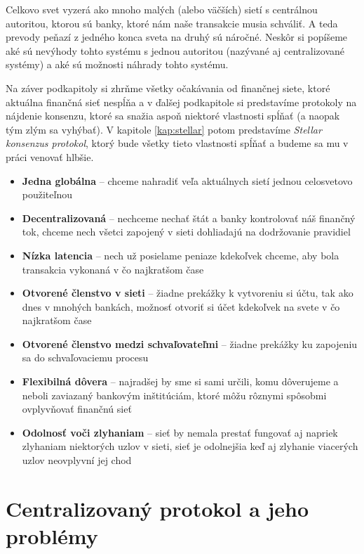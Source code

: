 Celkovo svet vyzerá ako mnoho malých (alebo väčších) sietí s centrálnou autoritou,
ktorou sú banky, ktoré nám naše transakcie musia schváliť.
A teda prevody peňazí z jedného konca sveta na druhý sú náročné.
Neskôr si popíšeme aké sú nevýhody tohto systému s jednou autoritou (nazývané aj
centralizované systémy) a aké sú možnosti náhrady tohto systému.

Na záver podkapitoly si zhrňme všetky očakávania od finančnej siete, ktoré
aktuálna finančná sieť nespĺňa a v ďalšej podkapitole si predstavíme protokoly
na nájdenie konsenzu, ktoré sa snažia aspoň niektoré vlastnosti spĺňať (a naopak
tým zlým sa vyhýbať).
V kapitole \ref{kap:stellar} potom predstavíme \textit{Stellar konsenzus protokol},
ktorý bude všetky tieto vlastnosti spĺňať a budeme sa mu v práci venovať hlbšie.

\begin{itemize}
\item  \textbf{Jedna globálna} -- chceme nahradiť veľa aktuálnych sietí jednou
celosvetovo použiteľnou
\item  \textbf{Decentralizovaná} -- nechceme nechať štát a banky kontrolovať náš
finančný tok, chceme nech všetci zapojený v sieti dohliadajú na dodržovanie
pravidiel
\item  \textbf{Nízka latencia} -- nech už posielame peniaze kdekoľvek chceme, aby
bola transakcia vykonaná v čo najkratšom čase
\item  \textbf{Otvorené členstvo v sieti} -- žiadne prekážky k vytvoreniu si
účtu, tak ako dnes v mnohých bankách, možnosť otvoriť si účet kdekoľvek na svete
v čo najkratšom čase
\item  \textbf{Otvorené členstvo medzi schvaľovateľmi} -- žiadne prekážky ku
zapojeniu sa do schvaľovaciemu procesu
\item  \textbf{Flexibilná dôvera} -- najradšej by sme si sami určili, komu
dôverujeme a neboli zaviazaný bankovým inštitúciám, ktoré môžu rôznymi
spôsobmi ovplyvňovať finančnú sieť
\item  \textbf{Odolnosť voči zlyhaniam} -- sieť by nemala prestať fungovať aj
napriek zlyhaniam niektorých uzlov v sieti, sieť je odolnejšia keď aj zlyhanie
viacerých uzlov neovplyvní jej chod
\end{itemize}

\pagebreak

\section {Centralizovaný protokol a jeho problémy}

